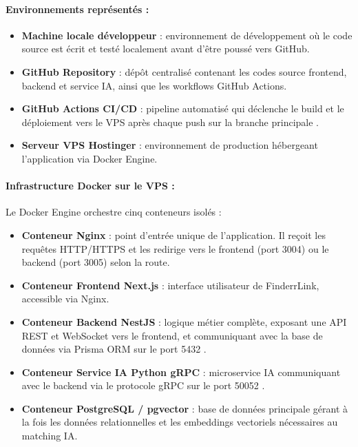\paragraph{Environnements représentés :}
\begin{itemize}
    \item \textbf{Machine locale développeur} : environnement de développement où le code source est écrit et testé localement avant d'être poussé vers GitHub.
    \item \textbf{GitHub Repository} : dépôt centralisé contenant les codes source frontend, backend et service IA, ainsi que les workflows GitHub Actions.
    \item \textbf{GitHub Actions CI/CD} : pipeline automatisé qui déclenche le build et le déploiement vers le VPS après chaque push sur la branche principale \cite{githubactions}.
    \item \textbf{Serveur VPS Hostinger} : environnement de production hébergeant l'application via Docker Engine.
\end{itemize}

\paragraph{Infrastructure Docker sur le VPS :}
Le Docker Engine orchestre cinq conteneurs isolés :
\begin{itemize}
    \item \textbf{Conteneur Nginx} : point d'entrée unique de l'application. Il reçoit les requêtes HTTP/HTTPS et les redirige vers le frontend (port 3004) ou le backend (port 3005) selon la route.
    \item \textbf{Conteneur Frontend Next.js} : interface utilisateur de FinderrLink, accessible via Nginx.
    \item \textbf{Conteneur Backend NestJS} : logique métier complète, exposant une API REST et WebSocket vers le frontend, et communiquant avec la base de données via Prisma ORM sur le port 5432 \cite{prisma}.
    \item \textbf{Conteneur Service IA Python gRPC} : microservice IA communiquant avec le backend via le protocole gRPC sur le port 50052 \cite{grpc}.
    \item \textbf{Conteneur PostgreSQL / pgvector} : base de données principale gérant à la fois les données relationnelles et les embeddings vectoriels nécessaires au matching IA.
\end{itemize}

